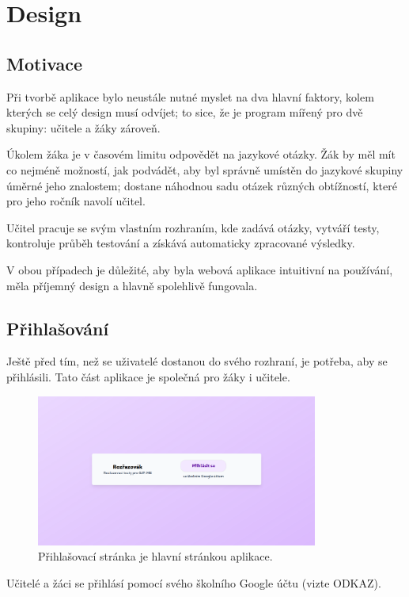 \hypertarget{Design}{\chapter{Design}}

\section{Motivace}

Při tvorbě aplikace bylo neustále nutné myslet na dva hlavní faktory, kolem kterých se celý design musí odvíjet; to sice, že je program mířený pro dvě skupiny: učitele a žáky zároveň. 

Úkolem žáka je v časovém limitu odpovědět na jazykové otázky. Žák by měl mít co nejméně možností, jak podvádět, aby byl správně umístěn do jazykové skupiny úměrné jeho znalostem; dostane náhodnou sadu otázek různých obtížností, které pro jeho ročník navolí učitel.

Učitel pracuje se svým vlastním rozhraním, kde zadává otázky, vytváří testy, kontroluje průběh testování a získává automaticky zpracované výsledky.

V obou případech je důležité, aby byla webová aplikace intuitivní na používání, měla příjemný design a hlavně spolehlivě fungovala.

\section{Přihlašování}

Ještě před tím, než se uživatelé dostanou do svého rozhraní, je potřeba, aby se přihlásili. Tato část aplikace je společná pro žáky i učitele. 

\begin{figure}[H]
    \centering
    \includegraphics[width=350px]{images/01design/login.png}
    \caption{Přihlašovací stránka je hlavní stránkou aplikace.}
\end{figure}

Učitelé a žáci se přihlásí pomocí svého školního Google účtu (vizte ODKAZ).

